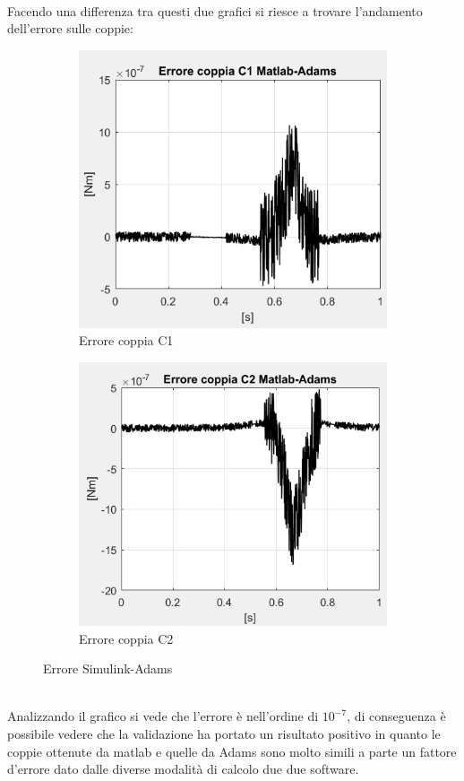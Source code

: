 \\Facendo una differenza tra questi due grafici si riesce a trovare l'andamento dell'errore sulle coppie:
\begin{figure}[!ht]
	\begin{subfigure}{.5\textwidth}
		\centering
		\includegraphics[width=.9\linewidth]{Immagini/Dinamica/confrc1.png}  
		\caption{Errore coppia C1}
		\label{fig:errC1}
	\end{subfigure}
	\begin{subfigure}{.5\textwidth}
		\centering
		\includegraphics[width=.9\linewidth]{Immagini/Dinamica/confrc2.png}  
		\caption{Errore coppia C2}
		\label{fig:errC2}
	\end{subfigure}
	\caption{Errore Simulink-Adams}
\end{figure}
\\Analizzando il grafico si vede che l'errore è nell'ordine di $10^{-7}$, di conseguenza è possibile vedere che la validazione ha portato un risultato positivo in quanto le coppie ottenute da matlab e quelle da Adams sono molto simili a parte un fattore d'errore dato dalle diverse modalità di calcolo due due software.
